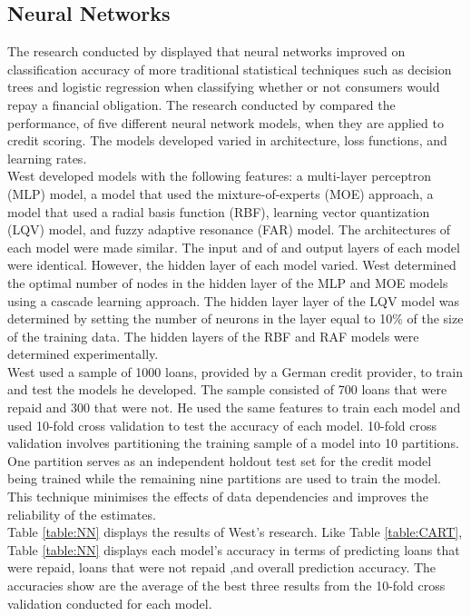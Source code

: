 \vspace{15pt}

\subsection{Neural Networks}

The research conducted by \textcite{DecTreesZekic} displayed that neural networks improved on classification accuracy of more traditional statistical techniques such as decision trees and logistic regression when classifying whether or not consumers would repay a financial obligation. The research conducted by \textcite{NNWest} compared the performance, of five different neural network models, when they are applied to credit scoring.  The models developed varied in architecture, loss functions, and learning rates.  \\

West developed models with the following features: a multi-layer perceptron (MLP) model, a model that used the mixture-of-experts (MOE) approach, a model that used a radial basis function (RBF), learning vector quantization (LQV) model, and fuzzy adaptive resonance (FAR) model. The architectures of each model were made similar. The input and of and output layers of each model were identical. However, the hidden layer of each model varied. West determined the optimal number of nodes in the hidden layer of the MLP and MOE models using a cascade learning approach. The hidden layer layer of the LQV model was determined by setting the number of neurons in the layer equal to 10\% of the size of the training data. The hidden layers of the RBF and RAF models were determined experimentally.  \\

West used a sample of 1000 loans, provided by a German credit provider, to train and test the models he developed. The sample consisted of 700 loans that were repaid and 300 that were not. He used the same features to train each model and used 10-fold cross validation to test the accuracy of each model. 10-fold cross validation involves partitioning the training sample of a model into 10 partitions. One partition serves as an independent holdout test set for the credit model being trained while the remaining nine partitions are used to train the model. This technique minimises the effects of data dependencies and improves the reliability of the estimates. \\

Table \ref{table:NN} displays the results of West's research. Like Table \ref{table:CART}, Table \ref{table:NN} displays each model's accuracy in terms of predicting loans that were repaid, loans that were not repaid ,and overall prediction accuracy. The accuracies show are the average of the best three results from the 10-fold cross validation conducted for each model. 

